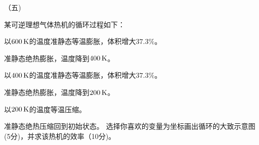 \documentclass[12pt,CJK]{article}
\begin{document}
  \item[（五)]{某可逆理想气体热机的循环过程如下：
      \bitem
    \item{以$600\,\mathrm{K}$的温度准静态等温膨胀，体积增大$37.3\%$。}
    \item{准静态绝热膨胀，温度降到$400\,\mathrm{K}$。}
    \item{以$400\,\mathrm{K}$的温度准静态等温膨胀，体积增大$37.3\%$。}      
    \item{准静态绝热膨胀，温度降到$200\,\mathrm{K}$。}
    \item{以$200\,\mathrm{K}$的温度等温压缩。}
    \item{准静态绝热压缩回到初始状态。}            
      \eitem
      选择你喜欢的变量为坐标画出循环的大致示意图(5分)，并求该热机的效率（10分)。
    }
\eitem


\ech
\end{document}
